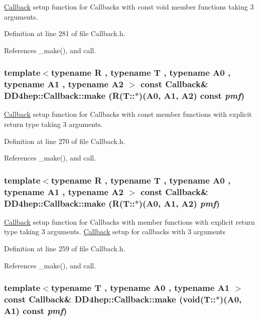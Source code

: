 \hyperlink{class_d_d4hep_1_1_callback}{Callback} setup function for Callbacks with const void member functions taking 3 arguments. 

Definition at line 281 of file Callback.h.

References \_\-make(), and call.\hypertarget{class_d_d4hep_1_1_callback_a747cb5a1ca93ae7b878dfc7e018d0e9b}{
\subsubsection[{make}]{\setlength{\rightskip}{0pt plus 5cm}template$<$typename R , typename T , typename A0 , typename A1 , typename A2 $>$ const {\bf Callback}\& DD4hep::Callback::make (R(T::$\ast$)(A0, A1, A2) const  {\em pmf})}}
\label{class_d_d4hep_1_1_callback_a747cb5a1ca93ae7b878dfc7e018d0e9b}


\hyperlink{class_d_d4hep_1_1_callback}{Callback} setup function for Callbacks with const member functions with explicit return type taking 3 arguments. 

Definition at line 270 of file Callback.h.

References \_\-make(), and call.\hypertarget{class_d_d4hep_1_1_callback_a98ec440d07e402f58036a5699dfc2458}{
\subsubsection[{make}]{\setlength{\rightskip}{0pt plus 5cm}template$<$typename R , typename T , typename A0 , typename A1 , typename A2 $>$ const {\bf Callback}\& DD4hep::Callback::make (R(T::$\ast$)(A0, A1, A2) {\em pmf})}}
\label{class_d_d4hep_1_1_callback_a98ec440d07e402f58036a5699dfc2458}


\hyperlink{class_d_d4hep_1_1_callback}{Callback} setup function for Callbacks with member functions with explicit return type taking 3 arguments. \hyperlink{class_d_d4hep_1_1_callback}{Callback} setup for callbacks with 3 arguments 

Definition at line 259 of file Callback.h.

References \_\-make(), and call.\hypertarget{class_d_d4hep_1_1_callback_a65524e85eac0683d3339c6548ff35449}{
\subsubsection[{make}]{\setlength{\rightskip}{0pt plus 5cm}template$<$typename T , typename A0 , typename A1 $>$ const {\bf Callback}\& DD4hep::Callback::make (void(T::$\ast$)(A0, A1) const  {\em pmf})}}
\label{class_d_d4hep_1_1_callback_a65524e85eac0683d3339c6548ff35449}


